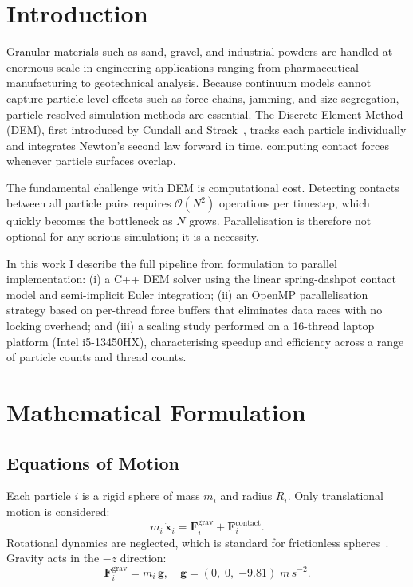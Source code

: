 \documentclass[10pt,twocolumn]{article}
\begin{document}
\section{Introduction}

Granular materials such as sand, gravel, and industrial powders are handled at
enormous scale in engineering applications ranging from pharmaceutical
manufacturing to geotechnical analysis.
Because continuum models cannot capture particle-level effects such as force
chains, jamming, and size segregation, particle-resolved simulation methods
are essential.
The Discrete Element Method (DEM), first introduced by Cundall and
Strack~\cite{Cundall1979}, tracks each particle individually and integrates
Newton's second law forward in time, computing contact forces whenever
particle surfaces overlap.

The fundamental challenge with DEM is computational cost.
Detecting contacts between all particle pairs requires $\mathcal{O}(N^2)$
operations per timestep, which quickly becomes the bottleneck as $N$ grows.
Parallelisation is therefore not optional for any serious simulation; it is
a necessity.

In this work I describe the full pipeline from formulation to parallel
implementation:
(i) a C++ DEM solver using the linear spring-dashpot contact model and
semi-implicit Euler integration;
(ii) an OpenMP parallelisation strategy based on per-thread force buffers
that eliminates data races with no locking overhead; and
(iii) a scaling study performed on a 16-thread laptop platform
(Intel i5-13450HX), characterising speedup and efficiency across a range
of particle counts and thread counts.

\section{Mathematical Formulation}

\subsection{Equations of Motion}

Each particle $i$ is a rigid sphere of mass $m_i$ and radius $R_i$.
Only translational motion is considered:
\begin{equation}
  m_i\,\ddot{\mathbf{x}}_i
    = \mathbf{F}_i^{\mathrm{grav}}
    + \mathbf{F}_i^{\mathrm{contact}}.
  \label{eq:newton}
\end{equation}
Rotational dynamics are neglected, which is standard for frictionless
spheres~\cite{Onate2011}.
Gravity acts in the $-z$ direction:
\begin{equation}
  \mathbf{F}_i^{\mathrm{grav}} = m_i\,\mathbf{g},\quad
  \mathbf{g} = (0,\;0,\;{-9.81})\;\si{m\,s^{-2}}.
\end{equation}
\end{document}
